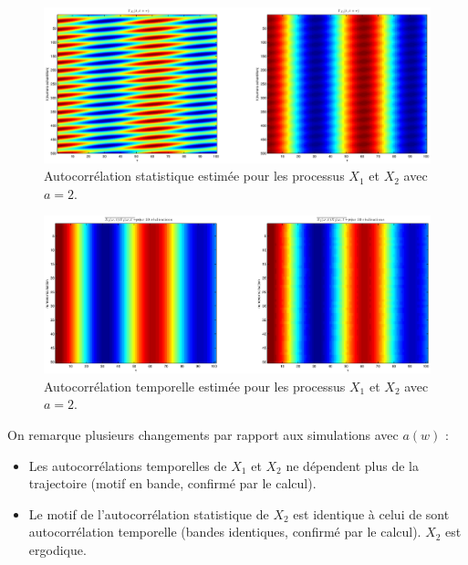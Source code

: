 \documentclass{article}
\begin{document}
\begin{figure}[h]
\hspace*{-1cm}
\includegraphics[width=14cm]{q51_2.eps}
\caption{Autocorrélation statistique estimée pour les processus $X_1$ et $X_2$ avec $a = 2$.}
\end{figure}

\begin{figure}[h]
\hspace*{-1cm}
\includegraphics[width=14cm]{q51_3.eps}
\caption{Autocorrélation temporelle estimée pour les processus $X_1$ et $X_2$ avec $a = 2$.}
\end{figure}

\newpage
\noindent
On remarque plusieurs changements par rapport aux simulations avec $a(w)$ :
\begin{itemize}
\item Les autocorrélations temporelles de $X_1$ et $X_2$ ne dépendent plus de la trajectoire (motif en bande, confirmé par le calcul).
\item Le motif de l'autocorrélation statistique de $X_2$ est identique à celui de sont autocorrélation temporelle (bandes identiques, confirmé par le calcul). $X_2$ est ergodique.
\end{itemize}

\newpage
\listoffigures
\end{document}

